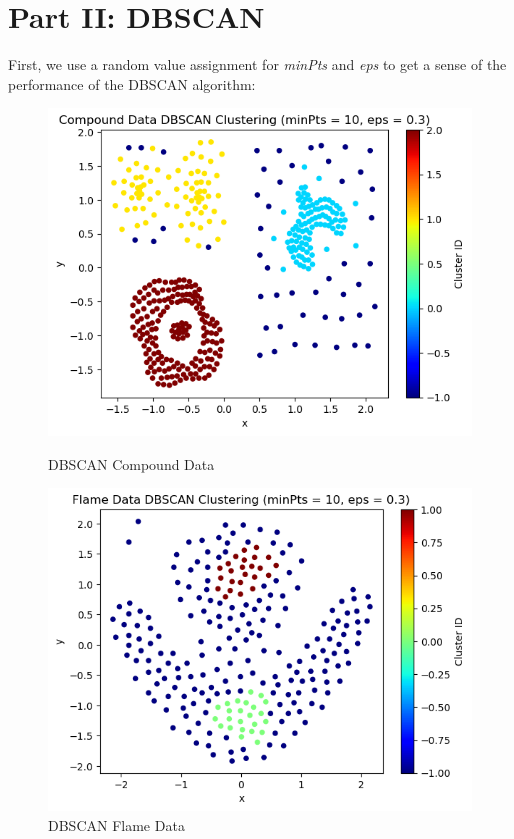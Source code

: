\documentclass{article}
\begin{document}
\newpage

\section{Part II: DBSCAN}

First, we use a random value assignment for \textit{minPts} and \textit{eps} to get a sense of the
performance of the DBSCAN algorithm: 
\begin{figure}[H]
    \centering
    \begin{minipage}[b]{0.49\textwidth}
        \centering
        \includegraphics[width=\textwidth]{DB_rand_compund.png}
        \caption{DBSCAN Compound Data}
    \end{minipage}
    \hfill
    \begin{minipage}[b]{0.49\textwidth}
        \centering
        \includegraphics[width=\textwidth]{DB_rand_flame.png}
        \caption{DBSCAN Flame Data}
    \end{minipage}
\end{figure}
\end{document}
